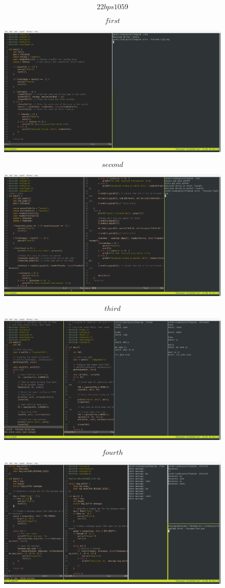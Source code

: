 \documentclass{article}
\begin{document}
$$22bps1059$$

\begin{figure}[htbp]
    $$first$$
    \centerline{ \includegraphics[width=1.5\linewidth]{fig1.png} }
    $$second$$
    \centerline{ \includegraphics[width=1.5\linewidth]{fig2.png} }
\end{figure}

\begin{figure}[htbp]
    $$third$$
    \centerline{ \includegraphics[width=1.5\linewidth]{fig3.png} }
    $$fourth$$
    \centerline{ \includegraphics[width=1.5\linewidth]{fig4.png} }
\end{figure}
\end{document}
